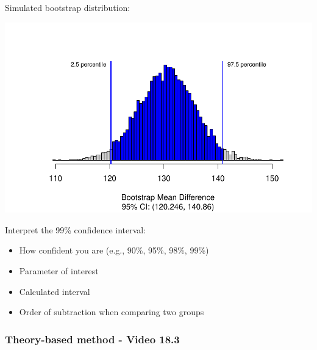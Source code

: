 \documentclass[
]{report}
\newenvironment{Shaded}{\begin{snugshade}}{\end{snugshade}}
\newcommand{\AttributeTok}[1]{\textcolor[rgb]{0.13,0.29,0.53}{#1}}
\newcommand{\CommentTok}[1]{\textcolor[rgb]{0.56,0.35,0.01}{\textit{#1}}}
\newcommand{\DecValTok}[1]{\textcolor[rgb]{0.00,0.00,0.81}{#1}}
\newcommand{\FloatTok}[1]{\textcolor[rgb]{0.00,0.00,0.81}{#1}}
\newcommand{\FunctionTok}[1]{\textcolor[rgb]{0.13,0.29,0.53}{\textbf{#1}}}
\newcommand{\NormalTok}[1]{#1}
\newcommand{\SpecialCharTok}[1]{\textcolor[rgb]{0.81,0.36,0.00}{\textbf{#1}}}
\begin{document}
Simulated bootstrap distribution:

\begin{Shaded}
\end{Shaded}

\begin{center}\includegraphics[width=0.7\linewidth]{11-VN11-paired_files/figure-latex/unnamed-chunk-6-1} \end{center}

\newpage

Interpret the 99\% confidence interval:

\begin{itemize}
\item
  How confident you are (e.g., 90\%, 95\%, 98\%, 99\%)
\item
  Parameter of interest
\item
  Calculated interval
\item
  Order of subtraction when comparing two groups
\end{itemize}

\vspace{0.8in}

\subsubsection*{Theory-based method - Video 18.3}\label{theory-based-method---video-18.3}
\end{document}
